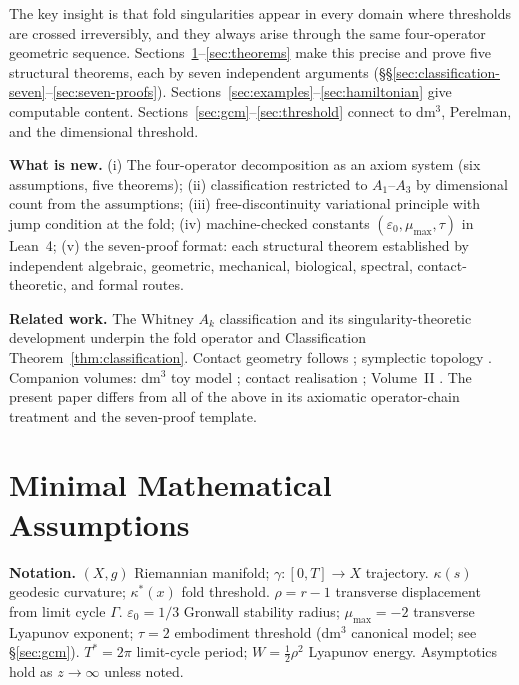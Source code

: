 \documentclass[14pt,a4paper]{extarticle}
\begin{document}
The key insight is that fold singularities appear in every domain where
thresholds are crossed irreversibly, and they always arise through the same
four-operator geometric sequence. Sections~\ref{sec:assumptions}--\ref{sec:theorems}
make this precise and prove five structural theorems, each by seven independent
arguments (\S\S\ref{sec:classification-seven}--\ref{sec:seven-proofs}).
Sections~\ref{sec:examples}--\ref{sec:hamiltonian} give computable content.
Sections~\ref{sec:gcm}--\ref{sec:threshold} connect to dm$^3$, Perelman, and the
dimensional threshold.

\textbf{What is new.}
(i) The four-operator decomposition as an axiom system (six assumptions, five theorems);
(ii) classification restricted to $A_1$--$A_3$ by dimensional count from the assumptions;
(iii) free-discontinuity variational principle with jump condition at the fold;
(iv) machine-checked constants $(\varepsilon_0, \mu_{\max}, \tau)$ in Lean~4;
(v) the seven-proof format: each structural theorem established by independent
algebraic, geometric, mechanical, biological, spectral, contact-theoretic,
and formal routes.

\textbf{Related work.}
The Whitney $A_k$ classification \cite{Whitney1955,Mather1968} and its
singularity-theoretic development \cite{GolubitskyGuillemin1973,Arnold1986}
underpin the fold operator and Classification Theorem~\ref{thm:classification}.
Contact geometry follows \cite{Geiges2008,Etnyre2003}; symplectic topology \cite{McDuffSalamon2017}.
Companion volumes: dm$^3$ toy model \cite{Grossi2026_SIAM}; contact realisation \cite{TOGT2026};
Volume~II \cite{Grossi2026_Vol2}.
The present paper differs from all of the above in its axiomatic operator-chain
treatment and the seven-proof template.

\section{Minimal Mathematical Assumptions}
\label{sec:assumptions}

\noindent\textbf{Notation.}
$(X,g)$ Riemannian manifold; $\gamma:[0,T]\to X$ trajectory.
$\kappa(s)$ geodesic curvature; $\kappa^*(x)$ fold threshold.
$\rho = r-1$ transverse displacement from limit cycle $\Gamma$.
$\varepsilon_0 = 1/3$ Gronwall stability radius;
$\mu_{\max} = -2$ transverse Lyapunov exponent;
$\tau = 2$ embodiment threshold (dm$^3$ canonical model; see \S\ref{sec:gcm}).
$T^* = 2\pi$ limit-cycle period; $W = \tfrac12\rho^2$ Lyapunov energy.
Asymptotics hold as $z\to\infty$ unless noted.
\end{document}
